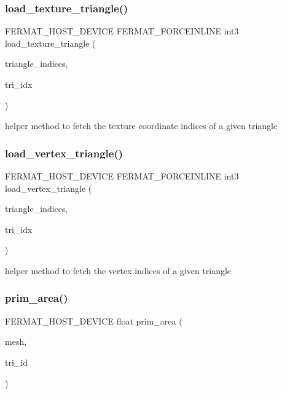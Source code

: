 \subsubsection{\texorpdfstring{load\+\_\+texture\+\_\+triangle()}{load\_texture\_triangle()}}
{\footnotesize\ttfamily F\+E\+R\+M\+A\+T\+\_\+\+H\+O\+S\+T\+\_\+\+D\+E\+V\+I\+CE F\+E\+R\+M\+A\+T\+\_\+\+F\+O\+R\+C\+E\+I\+N\+L\+I\+NE int3 load\+\_\+texture\+\_\+triangle (\begin{DoxyParamCaption}\item[{const int $\ast$}]{triangle\+\_\+indices,  }\item[{const uint32}]{tri\+\_\+idx }\end{DoxyParamCaption})}

helper method to fetch the texture coordinate indices of a given triangle \mbox{\label{group___mesh_module_ga50a8be2a2adb88816865cbd13a5aab57}} 
\subsubsection{\texorpdfstring{load\+\_\+vertex\+\_\+triangle()}{load\_vertex\_triangle()}}
{\footnotesize\ttfamily F\+E\+R\+M\+A\+T\+\_\+\+H\+O\+S\+T\+\_\+\+D\+E\+V\+I\+CE F\+E\+R\+M\+A\+T\+\_\+\+F\+O\+R\+C\+E\+I\+N\+L\+I\+NE int3 load\+\_\+vertex\+\_\+triangle (\begin{DoxyParamCaption}\item[{const int $\ast$}]{triangle\+\_\+indices,  }\item[{const uint32}]{tri\+\_\+idx }\end{DoxyParamCaption})}

helper method to fetch the vertex indices of a given triangle \mbox{\label{group___mesh_module_ga516a7610fe394a18d5083aa21f6cda75}} 
\subsubsection{\texorpdfstring{prim\+\_\+area()}{prim\_area()}}
{\footnotesize\ttfamily F\+E\+R\+M\+A\+T\+\_\+\+H\+O\+S\+T\+\_\+\+D\+E\+V\+I\+CE float prim\+\_\+area (\begin{DoxyParamCaption}\item[{const \hyperlink{struct_mesh_view}{Mesh\+View} \&}]{mesh,  }\item[{const uint32}]{tri\+\_\+id }\end{DoxyParamCaption})\hspace{0.3cm}{\ttfamily [inline]}}

